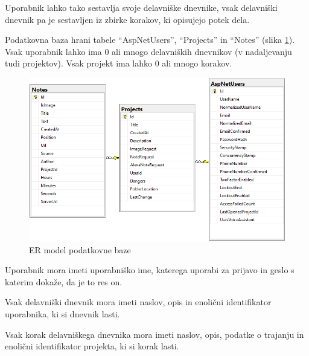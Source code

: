 \documentclass[a4paper, 12pt]{book}
\begin{document}
Uporabnik lahko tako sestavlja svoje delavniške dnevnike, vsak delavniški dnevnik pa je sestavljen iz zbirke korakov, ki opisujejo potek dela.

Podatkovna baza hrani tabele \enquote{AspNetUsers}, \enquote{Projects} in \enquote{Notes} (slika \ref{er_diagram}).
Vsak uporabnik lahko ima 0 ali mnogo delavniških dnevnikov (v nadaljevanju tudi projektov).
Vsak projekt ima lahko 0 ali mnogo korakov.

\begin{figure}[H]
\begin{center}
\includegraphics[width=13.5cm]{er_diagram_small}
\end{center}
\caption{ER model podatkovne baze}
\label{er_diagram}
\end{figure}

Uporabnik mora imeti uporabniško ime, katerega uporabi za prijavo in geslo s katerim dokaže, da je to res on.

Vsak delavniški dnevnik mora imeti naslov, opis in enolični identifikator uporabnika, ki si dnevnik lasti.

Vsak korak delavniškega dnevnika mora imeti naslov, opis, podatke o trajanju in enolični identifikator projekta, ki si korak lasti.


\end{document}
